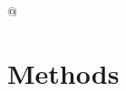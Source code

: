 \documentclass[11pt,a4paper,twoside]{book}\usepackage[]{graphicx}\usepackage[]{color}
\begin{document}
@
% 
% 
% 
% 
% 
% 





\chapter{Methods} 
\end{document}
